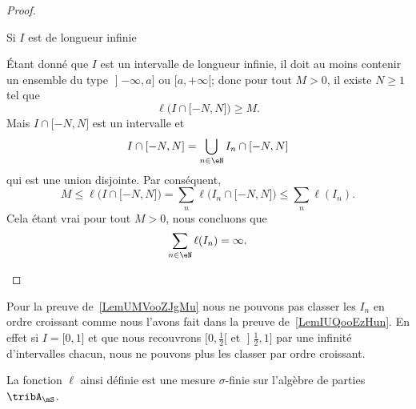 \begin{proof}
\begin{subproof}
        \item[Si \( I\) est de longueur infinie]

        Étant donné que \( I\) est un intervalle de longueur infinie, il doit au moins contenir un ensemble du type \( \mathopen] -\infty , a \mathclose]\) ou \( \mathopen[ a , +\infty [\); donc  pour tout \( M>0\), il existe \( N\geq 1\) tel que
            \begin{equation}
                \ell\big( I\cap\mathopen[ -N , N \mathclose] \big)\geq M.
            \end{equation}
            Mais \( I\cap\mathopen[ -N , N \mathclose]\) est un intervalle et
            \begin{equation}
                I\cap\mathopen[ -N , N \mathclose]=\bigcup_{n\in \eN}I_n\cap\mathopen[ -N , N \mathclose]
            \end{equation}
            qui est une union disjointe. Par conséquent,
            \begin{equation}
                M\leq \ell\big( I\cap\mathopen[ -N , N \mathclose] \big)=\sum_n\ell\big( I_n\cap\mathopen[ -N , N \mathclose] \big)\leq\sum_n\ell(I_n).
            \end{equation}
            Cela étant vrai pour tout \( M>0\), nous concluons que
            \begin{equation}
                \sum_{n\in \eN}\ell(I_n)=\infty.
            \end{equation}
    \end{subproof}
\end{proof}

\begin{remark}
    Pour la preuve de~\ref{LemUMVooZJgMu} nous ne pouvons pas classer les \( I_n\) en ordre croissant comme nous l'avons fait dans la preuve de~\ref{LemIUQooEzHun}. En effet si \( I=\mathopen[ 0 , 1 \mathclose]\) et que nous recouvrons \( \mathopen[ 0 , \frac{ 1 }{2} [\) et \( \mathopen] \frac{ 1 }{2} , 1 \mathclose]\) par une infinité d'intervalles chacun, nous ne pouvons plus les classer par ordre croissant.
\end{remark}

\begin{proposition}     \label{PropULFoodgXrR}
    La fonction \( \ell\) ainsi définie est une mesure \( \sigma\)-finie sur l'algèbre de parties \( \tribA_{\mS}\).
\end{proposition}

